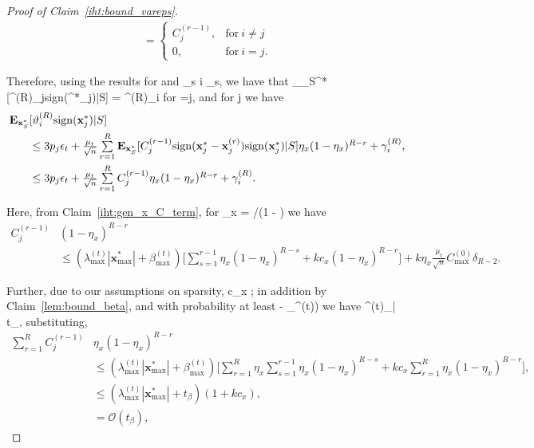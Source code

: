 \documentclass{article}
\newcommand{\sgn}{{\rm sign}}
\def\[#1\]{{$#1$}}
\def\b#1{{\mathbf{#1}}}
\begin{document}
\begin{proof}[Proof of Claim~\ref{iht:bound_vareps}]
\begin{align}
	=
	\begin{cases}
	C^{(r-1)}_{j}, &\text{for}~  i \neq j\\
	0, &\text{for}~ i = j.
	\end{cases}
	\end{align}
	
	Therefore, using the results for \[\clubsuit\] and \[\textstyle\sum\limits_{s \neq i} \spadesuit_s\], we have that \[\b{E}_{\b{x}_S^*}[\vartheta^{(R)}_{j}\sgn(\b{x}^*_{j})|S] =  \gamma^{(R)}_i\] for \[i=j\], and for \[i \neq j\] we have
	\begin{align}\label{eq:exp_var_theta_int}
	\b{E}_{\b{x}_S^*}&[\vartheta^{(R)}_{i}\sgn(\b{x}^*_{j})|S]\notag\\
	
	


&\leq 3p_{j}\epsilon_t + \tfrac{\mu_t}{\sqrt{n}}\textstyle\sum\limits_{r = 1}^{R }	\b{E}_{\b{x}_S^*}[C_{j}^{(r-1)} \sgn(\b{x}_{j}^* - \b{x}_{j}^{(r)})\sgn(\b{x}^*_{j})|S]\eta_{x} (1- \eta_x)^{{R} - r } + \gamma^{(R)}_i,\notag\\
	&\leq 3p_{j}\epsilon_t + \tfrac{\mu_t}{\sqrt{n}}\textstyle\sum\limits_{r = 1}^{R }C_{j}^{(r-1)}\eta_{x} (1- \eta_x)^{{R} - r } + \gamma^{(R)}_i.
	\end{align}
	
	
	
	
	
	
	
	Here, from Claim~\ref{iht:gen_x_C_term}, for \[c_x = {}/{(1 - )}\] we have
	\begin{align*}
	C_{j}^{(r-1)} &(1- \eta_x)^{{R} - r}\\
	&\leq (\lambda^{(t)}_{\max} |\b{x}_{\max}^*| +\beta^{(t)}_{\max}) \bigg[ \textstyle\sum\limits_{s=1}^{r-1}\eta_x(1- \eta_x)^{{R} - s} + 
	kc_x(1- \eta_x)^{{R} - r}\bigg] + k\eta_x\tfrac{\mu_t}{\sqrt{n}}C_{\max}^{(0)} \delta_{{R}-2}.
	\end{align*}
	
	
	
	
	
	
	
	
	
	
	Further, due to our assumptions on sparsity, \[kc_x \]; in addition by Claim~\ref{lem:bound_beta}, and with probability at least \[(1 - \delta_{\beta}^{(t)})\] we have \[|\beta^{(t)}_{\max}| \leq t_\beta\], substituting,
	\begin{align*}
	\textstyle\sum\limits_{r = 1}^{R }	C^{(r-1)}_{j}&\eta_{x} (1- \eta_x)^{{R} - r }\\
	&\leq  (\lambda^{(t)}_{\max} |\b{x}_{\max}^*| +\beta^{(t)}_{\max}) \bigg[ \textstyle\sum\limits_{r = 1}^{R }	\eta_{x}\textstyle\sum\limits_{s=1}^{r-1}\eta_x(1- \eta_x)^{{R} - s} + kc_x\sum\limits_{r = 1}^{R }	\eta_{x}(1- \eta_x)^{{R} - r}\bigg],\\
	&\leq(\lambda^{(t)}_{\max} |\b{x}_{\max}^*| +t_\beta)( 1 + kc_x ),\\
	&= \mathcal{O}(t_\beta),
	

\end{align*}
\end{proof}
\end{document}
